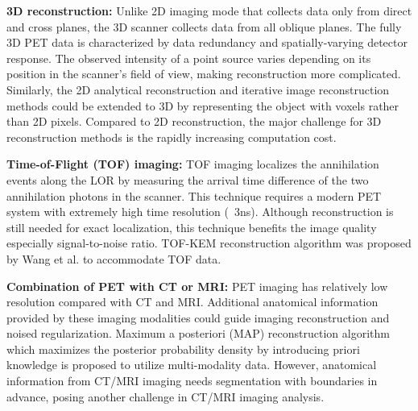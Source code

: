 \documentclass[11pt,a4paper]{article}
\begin{document}
    \noindent\textbf{3D reconstruction:} Unlike 2D imaging mode that collects data only from direct and cross planes, the 3D scanner collects data from all oblique planes. The fully 3D PET data is characterized by data redundancy and spatially-varying detector response. The observed intensity of a point source varies depending on its position in the scanner's field of view, making reconstruction more complicated. Similarly, the 2D analytical reconstruction and iterative image reconstruction methods could be extended to 3D by representing the object with voxels rather than 2D pixels. 
    Compared to 2D reconstruction, the major challenge for 3D reconstruction methods is the rapidly increasing computation cost\cite{tong2010petctreview}. 

    \noindent\textbf{Time-of-Flight (TOF) imaging:} TOF imaging localizes the annihilation events along the LOR by measuring the arrival time difference of the two annihilation photons in the scanner. This technique requires a modern PET system with extremely high time resolution (~3ns). Although reconstruction is still needed for exact localization, this technique benefits the image quality especially signal-to-noise ratio. TOF-KEM reconstruction algorithm was proposed by Wang et al. to accommodate TOF data\cite{wang2021tof}. 

    \noindent\textbf{Combination of PET with CT or MRI:} PET imaging has relatively low resolution compared with CT and MRI. Additional anatomical information provided by these imaging modalities could guide imaging reconstruction and noised regularization. Maximum a posteriori (MAP) reconstruction algorithm which maximizes the posterior probability density by introducing priori knowledge is proposed to utilize multi-modality data. However, anatomical information from CT/MRI imaging needs segmentation with boundaries in advance, posing another challenge in CT/MRI imaging analysis\cite{tong2010petctreview}.
\end{document}
